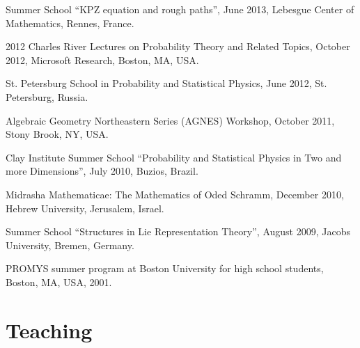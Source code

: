 \documentclass[letterpaper,11pt]{article}
\begin{document}
\begin{etaremune}
	\item
	      Summer School ``KPZ equation and rough paths'',
	      June 2013,
	      Lebesgue Center of Mathematics, Rennes, France.

	\item
	      2012 Charles River Lectures on Probability Theory and Related
	      Topics,
	      October 2012, Microsoft Research, Boston, MA, USA.

	\item
	      St. Petersburg School in Probability and Statistical Physics,
	      June 2012,
	      St. Petersburg, Russia.

	\item
	      Algebraic Geometry Northeastern Series (AGNES) Workshop,
	      October 2011,
	      Stony Brook, NY, USA.

	\item
	      Clay Institute Summer School ``Probability and Statistical
	      Physics in
	      Two and more Dimensions'', July 2010, Buzios, Brazil.

	\item
	      Midrasha Mathematicae: The Mathematics of Oded Schramm, December
	      2010,
	      Hebrew University, Jerusalem, Israel.

	\item
	      Summer School ``Structures in Lie Representation Theory'',
	      August 2009,
	      Jacobs University, Bremen, Germany.

	\item
	      PROMYS summer program at Boston University for high school
	      students,
	      Boston, MA, USA, 2001.
\end{etaremune}

\section*{Teaching}
\end{document}
